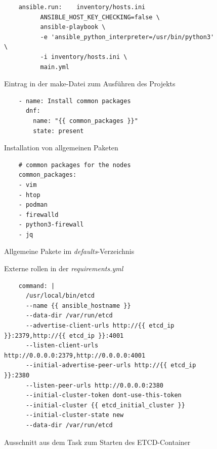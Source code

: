 \documentclass[11pt,a4paper]{article}
\begin{document}
\begin{figure}[!htbp]
  \begin{lstlisting}
    ansible.run:	inventory/hosts.ini
          ANSIBLE_HOST_KEY_CHECKING=false \
          ansible-playbook \
          -e 'ansible_python_interpreter=/usr/bin/python3' \
          -i inventory/hosts.ini \
          main.yml
  \end{lstlisting}
  \caption{Eintrag in der \gls{make}-Datei zum Ausführen des Projekts}
  \label{figure:make-ansible}
\end{figure}

\begin{figure}[!htbp]
  \begin{lstlisting}
    - name: Install common packages
      dnf:
        name: "{{ common_packages }}"
        state: present
  \end{lstlisting}
  \caption{Installation von allgemeinen Paketen}
  \label{figure:base-install}
\end{figure}

\begin{figure}[!htbp]
  \begin{lstlisting}
    # common packages for the nodes
    common_packages:
    - vim
    - htop
    - podman
    - firewalld
    - python3-firewall
    - jq
  \end{lstlisting}
  \caption{Allgemeine Pakete im \emph{defaults}-Verzeichnis}
  \label{figure:base-packages}
\end{figure}

\begin{figure}[!htbp]
  
  \caption{Externe \gls{rollen} in der \emph{requirements.yml}}
  \label{figure:requirements}
\end{figure}

\begin{figure}[!htbp]
  \begin{lstlisting}
    command: |
      /usr/local/bin/etcd
      --name {{ ansible_hostname }}
      --data-dir /var/run/etcd
      --advertise-client-urls http://{{ etcd_ip }}:2379,http://{{ etcd_ip }}:4001
      --listen-client-urls http://0.0.0.0:2379,http://0.0.0.0:4001
      --initial-advertise-peer-urls http://{{ etcd_ip }}:2380
      --listen-peer-urls http://0.0.0.0:2380
      --initial-cluster-token dont-use-this-token
      --initial-cluster {{ etcd_initial_cluster }}
      --initial-cluster-state new
      --data-dir /var/run/etcd
  \end{lstlisting}
  \caption{Ausschnitt aus dem Task zum Starten des ETCD-Container}
  \label{figure:etcd-command}
\end{figure}
\end{document}
